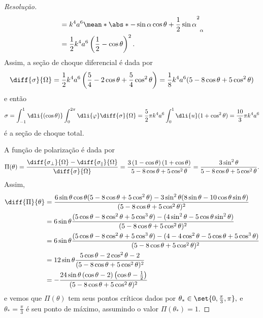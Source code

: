 \begin{proof}[Resolução]
\begin{align*}
                                    &= k^4 a^6 \mean*{\abs*{-\sin \alpha \cos\theta + \frac12 \sin \alpha}^2}_\alpha\\
                                    &= \frac12 k^4 a^6 \left(\frac12 - \cos\theta\right)^2.
   \end{align*}
   Assim, a seção de choque diferencial é dada por
   \begin{equation*}
      \diff{\sigma}{\Omega} = \frac12 k^4 a^6\left(\frac54 - 2\cos\theta + \frac54\cos^2\theta\right) = \frac18 k^4 a^6 (5 - 8 \cos\theta + 5\cos^2\theta)
   \end{equation*}
   e então
   \begin{equation*}
      \sigma = \int_{-1}^1\dli{(\cos\theta)}\int_0^{2\pi} \dli{\varphi} \diff{\sigma}{\Omega} = \frac52\pi k^4 a^6\int_0^1 \dli{u} (1 + \cos^2\theta) = \frac{10}3\pi k^4 a^6 
   \end{equation*}
   é a seção de choque total.

   A função de polarização é dada por
   \begin{equation*}
      \Pi(\theta) = \frac{\diff{\sigma_\perp}{\Omega} - \diff{\sigma_\parallel}{\Omega}}{\diff{\sigma}{\Omega}} = \frac{3\left(1 - \cos\theta\right)\left(1 + \cos\theta\right)}{5 - 8 \cos\theta + 5\cos^2\theta} = \frac{3 \sin^2\theta}{5 - 8 \cos\theta + 5\cos^2\theta}.
   \end{equation*}
   Assim, 
   \begin{align*}
      \diff{\Pi}{\theta} &= \frac{6 \sin\theta \cos\theta (5 - 8 \cos\theta + 5 \cos^2\theta) - 3\sin^2\theta (8 \sin\theta - 10 \cos\theta\sin\theta)}{(5 - 8 \cos\theta + 5 \cos^2\theta)^2}\\
                         &= 6\sin\theta\frac{(5\cos\theta - 8 \cos^2\theta + 5 \cos^3\theta) - (4 \sin^2\theta - 5 \cos\theta\sin^2\theta)}{(5 - 8 \cos\theta + 5 \cos^2\theta)^2}\\
                         &= 6\sin\theta\frac{(5\cos\theta - 8 \cos^2\theta + 5 \cos^3\theta) - (4 - 4\cos^2\theta - 5 \cos\theta + 5 \cos^3\theta)}{(5 - 8 \cos\theta + 5 \cos^2\theta)^2}\\
                         &= 12 \sin\theta\frac{5 \cos\theta - 2\cos^2\theta - 2}{(5 - 8 \cos\theta + 5 \cos^2\theta)^2}\\
                         &= -\frac{24 \sin\theta \left(\cos\theta - 2\right)\left(\cos\theta - \frac12\right)}{(5 - 8 \cos\theta + 5 \cos^2\theta)^2}
   \end{align*}
   e vemos que \(\Pi(\theta)\) tem seus pontos críticos dados por \(\theta_* \in \set{0, \frac\pi3,\pi},\) e \(\theta_* = \frac\pi3\) é seu ponto de máximo, assumindo o valor \(\Pi(\theta_*) = 1.\)
\end{proof}
